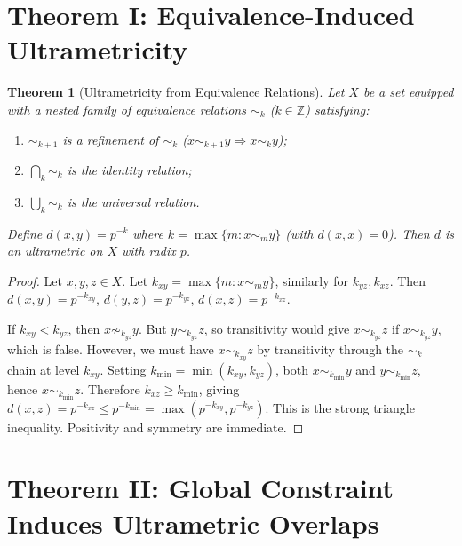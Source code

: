 \documentclass[12pt,a4paper]{article}
\newtheorem{theorem}{Theorem}[section]
\newcommand{\Z}{\mathbb{Z}}
\begin{document}
\section{Theorem I: Equivalence-Induced Ultrametricity}

\begin{theorem}[Ultrametricity from Equivalence Relations]\label{thm:equivalence}
Let $X$ be a set equipped with a nested family of equivalence relations $\sim_k$ ($k \in \Z$) satisfying:
\begin{enumerate}[label=(\roman*),nosep]
\item $\sim_{k+1}$ is a refinement of $\sim_k$ ($x \sim_{k+1} y \Rightarrow x \sim_k y$);
\item $\bigcap_k \sim_k$ is the identity relation;
\item $\bigcup_k \sim_k$ is the universal relation.
\end{enumerate}
Define $d(x,y) = p^{-k}$ where $k = \max\{m : x \sim_m y\}$ (with $d(x,x)=0$). Then $d$ is an ultrametric on $X$ with radix $p$.
\end{theorem}

\begin{proof}
Let $x,y,z \in X$. Let $k_{xy} = \max\{m : x \sim_m y\}$, similarly for $k_{yz}, k_{xz}$. Then $d(x,y) = p^{-k_{xy}}$, $d(y,z) = p^{-k_{yz}}$, $d(x,z) = p^{-k_{xz}}$.

If $k_{xy} < k_{yz}$, then $x \not\sim_{k_{yz}} y$. But $y \sim_{k_{yz}} z$, so transitivity would give $x \sim_{k_{yz}} z$ if $x \sim_{k_{yz}} y$, which is false. However, we must have $x \sim_{k_{xy}} z$ by transitivity through the $\sim_k$ chain at level $k_{xy}$. Setting $k_{\min} = \min(k_{xy}, k_{yz})$, both $x \sim_{k_{\min}} y$ and $y \sim_{k_{\min}} z$, hence $x \sim_{k_{\min}} z$. Therefore $k_{xz} \ge k_{\min}$, giving $d(x,z) = p^{-k_{xz}} \le p^{-k_{\min}} = \max(p^{-k_{xy}}, p^{-k_{yz}})$. This is the strong triangle inequality. Positivity and symmetry are immediate.
\end{proof}

\section{Theorem II: Global Constraint Induces Ultrametric Overlaps}
\end{document}
